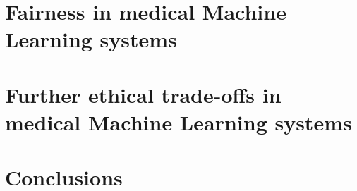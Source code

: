 \documentclass[11pt,english]{article}
\begin{document}
\section{Fairness in medical Machine Learning systems}
\label{combination}


\section{Further ethical trade-offs in medical Machine Learning systems}
\label{new_tradeoff}


\section{Conclusions}
\label{conclusions}

 
%
\clearpage




\printbibliography
\end{document}
